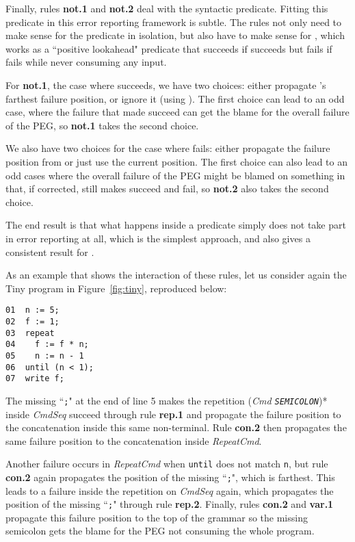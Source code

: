 \documentclass[3p,12pt,singlecolumn]{elsarticle}
\begin{document}
Finally, rules {\bf not.1} and {\bf not.2} deal with
the syntactic predicate. Fitting this predicate in
this error reporting framework is subtle. The rules
not only need to make sense for the predicate in
isolation, but also have to make sense for , which
works as a ``positive lookahead" predicate that succeeds
if  succeeds but fails if  fails while never
consuming any input.

For {\bf not.1}, the case where  succeeds, we have two
choices: either propagate 's farthest failure position, or
ignore it (using ). The first choice can lead to an
odd case, where the failure that made  succeed can get
the blame for the overall failure of the PEG, so
{\bf not.1} takes the second choice.

We also have two choices for the
case where  fails: either propagate the failure position
from  or just use the current position. The first choice
can also lead to an odd cases where the overall failure
of the PEG might be blamed on something in  that, if
corrected, still makes  succeed and  fail, so
{\bf not.2} also takes the second choice.

The end result is that what happens inside a predicate simply
does not take part in error reporting at all, which is the
simplest approach, and also gives a consistent result for
.

As an example that shows the interaction of these
rules, let us consider again the Tiny program in
Figure~\ref{fig:tiny}, reproduced below:

\begin{verbatim}
01  n := 5;
02  f := 1;
03  repeat
04    f := f * n;
05    n := n - 1
06  until (n < 1);
07  write f;
\end{verbatim}

The missing ``{\tt ;}" at the end of line 5
makes the repetition ({\it Cmd {\tt SEMICOLON}})*
inside {\it CmdSeq} succeed through rule {\bf rep.1}
and propagate the failure position to the concatenation
inside this same non-terminal. Rule {\bf con.2} then
propagates the same failure position to the concatenation
inside {\it RepeatCmd}.

Another failure occurs in {\it RepeatCmd} when {\tt until}
does not match {\tt n}, but rule {\bf con.2} again propagates
the position of the missing ``{\tt ;}", which is farthest.
This leads to a failure inside the repetition on {\it CmdSeq}
again, which propagates the position of the missing ``{\tt ;}"
through rule {\bf rep.2}. Finally, rules {\bf con.2} and {\bf var.1}
propagate this failure position to the top of the grammar
so the missing semicolon gets the blame for the PEG
not consuming the whole program.
\end{document}
